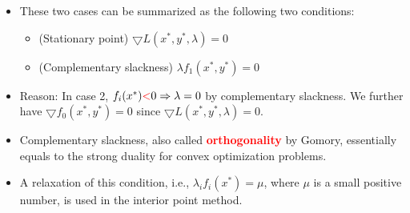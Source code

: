 \documentclass[mathserif]{beamer}
\begin{document}
{%
%        
\begin{itemize}
\item 
These two cases can be  summarized as the following two conditions: 
\begin{itemize}
\item (Stationary point) $\bigtriangledown L({x^*, y^*, \lambda }) = {0}$
\item (Complementary slackness) $\lambda f_1( {x^*, y^*}) = 0$
\end{itemize} 
\item Reason: In case 2, $f_i({x^*}) \textcolor{red}{<} 0 \Rightarrow  \lambda = 0 $ by complementary slackness. We further have $\bigtriangledown f_0({x^*, y^*}) = 0$ since $\bigtriangledown L({x^*, y^*, \lambda }) = {0}$. 
		\item Complementary slackness, also called \textcolor{red}{\bf orthogonality} by Gomory, essentially equals to the strong duality for convex optimization problems. 
		\item A relaxation of this condition, i.e., $\lambda_i f_i( {x^*}) = \mu$, where $\mu$ is a small positive number,  is used in the interior point method. 
\end{itemize}

}
\end{document}
